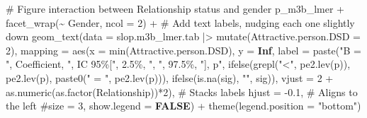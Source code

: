 \documentclass[
  bookmarksnumbered]{article}
\newenvironment{Shaded}{\begin{snugshade}}{\end{snugshade}}
\newcommand{\AttributeTok}[1]{\textcolor[rgb]{0.80,0.80,0.80}{#1}}
\newcommand{\CommentTok}[1]{\textcolor[rgb]{0.50,0.62,0.50}{#1}}
\newcommand{\ConstantTok}[1]{\textcolor[rgb]{0.86,0.64,0.64}{\textbf{#1}}}
\newcommand{\DecValTok}[1]{\textcolor[rgb]{0.86,0.86,0.80}{#1}}
\newcommand{\FloatTok}[1]{\textcolor[rgb]{0.75,0.75,0.82}{#1}}
\newcommand{\FunctionTok}[1]{\textcolor[rgb]{0.94,0.94,0.56}{#1}}
\newcommand{\NormalTok}[1]{\textcolor[rgb]{0.80,0.80,0.80}{#1}}
\newcommand{\SpecialCharTok}[1]{\textcolor[rgb]{0.86,0.64,0.64}{#1}}
\newcommand{\StringTok}[1]{\textcolor[rgb]{0.80,0.58,0.58}{#1}}
\begin{document}
\begin{Shaded}
\begin{Highlighting}[]
\CommentTok{\# Figure interaction between Relationship status and gender}
\NormalTok{p\_m3b\_lmer  }\SpecialCharTok{+}
  \FunctionTok{facet\_wrap}\NormalTok{(}\SpecialCharTok{\textasciitilde{}}\NormalTok{ Gender, }\AttributeTok{ncol =} \DecValTok{2}\NormalTok{) }\SpecialCharTok{+}
  \CommentTok{\# Add text labels, nudging each one slightly down}
  \FunctionTok{geom\_text}\NormalTok{(}\AttributeTok{data =}\NormalTok{ slop.m3b\_lmer.tab }\SpecialCharTok{|\textgreater{}} 
              \FunctionTok{mutate}\NormalTok{(}\AttributeTok{Attractive.person.DSD =} \DecValTok{2}\NormalTok{),}
            \AttributeTok{mapping =} \FunctionTok{aes}\NormalTok{(}\AttributeTok{x =} \FunctionTok{min}\NormalTok{(Attractive.person.DSD), }\AttributeTok{y =} \ConstantTok{Inf}\NormalTok{, }
                          \AttributeTok{label =} \FunctionTok{paste}\NormalTok{(}\StringTok{"B = "}\NormalTok{, Coefficient, }
                                        \StringTok{", IC 95\%["}\NormalTok{, }\StringTok{\textasciigrave{}}\AttributeTok{2.5\%}\StringTok{\textasciigrave{}}\NormalTok{, }\StringTok{", "}\NormalTok{, }\StringTok{\textasciigrave{}}\AttributeTok{97.5\%}\StringTok{\textasciigrave{}}\NormalTok{, }
                                        \StringTok{"], p"}\NormalTok{, }
                                        \FunctionTok{ifelse}\NormalTok{(}\FunctionTok{grepl}\NormalTok{(}\StringTok{"\textless{}"}\NormalTok{, }\FunctionTok{pe2.lev}\NormalTok{(p)), }\FunctionTok{pe2.lev}\NormalTok{(p), }
                                               \FunctionTok{paste0}\NormalTok{(}\StringTok{" = "}\NormalTok{, }\FunctionTok{pe2.lev}\NormalTok{(p))),}
                                        \FunctionTok{ifelse}\NormalTok{(}\FunctionTok{is.na}\NormalTok{(sig), }\StringTok{""}\NormalTok{, sig)),}
                          \AttributeTok{vjust =} \DecValTok{2} \SpecialCharTok{+} \FunctionTok{as.numeric}\NormalTok{(}\FunctionTok{as.factor}\NormalTok{(Relationship))}\SpecialCharTok{*}\DecValTok{2}\NormalTok{),  }\CommentTok{\# Stacks labels}
            \AttributeTok{hjust =} \SpecialCharTok{{-}}\FloatTok{0.1}\NormalTok{,  }\CommentTok{\# Aligns to the left}
            \CommentTok{\#size = 3,}
            \AttributeTok{show.legend =} \ConstantTok{FALSE}\NormalTok{) }\SpecialCharTok{+}
  \FunctionTok{theme}\NormalTok{(}\AttributeTok{legend.position =} \StringTok{"bottom"}\NormalTok{)}
\end{Highlighting}
\end{Shaded}
\end{document}
